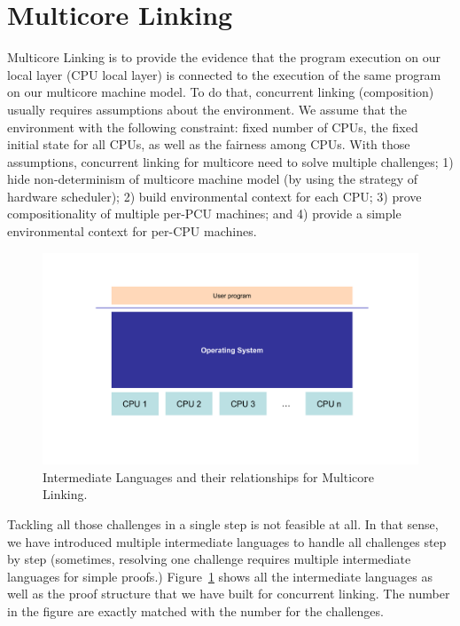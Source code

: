 \section{Multicore Linking}
\label{chapter:linking:sec:multicore-linking}

Multicore Linking is to provide the evidence that the program execution on
our local layer (CPU local layer) is connected to the execution of the same program on our multicore machine model. 
To do that, concurrent linking (composition) usually requires assumptions about the environment. 
We assume that the environment with the following constraint:
fixed number of CPUs, the fixed initial state for all CPUs,
as well as the fairness among CPUs.
With those assumptions, 
concurrent linking for multicore need to solve multiple challenges;
1) hide non-determinism of multicore machine model (by using the strategy of hardware scheduler);
2) build environmental context for each CPU;
3) prove compositionality of multiple per-PCU machines;
and 4) provide a simple environmental context for per-CPU machines. 
\begin{figure}
\begin{center}
\includegraphics[width=\textwidth, page=16]{figs/conlink/concurrent_linking}
\end{center}
\caption{Intermediate Languages and their relationships for Multicore Linking.}
\label{fig:chapter:conlink:intermediate-languages-and-their-relationsihps-for-multicore-linking}
\end{figure}
Tackling all those challenges in a single step is not feasible at all. 
In that sense, 
we have introduced multiple intermediate languages 
to handle all challenges step by step (sometimes,
resolving one challenge requires multiple intermediate languages
for simple proofs.) 
Figure~\ref{fig:chapter:conlink:intermediate-languages-and-their-relationsihps-for-multicore-linking} shows
all the intermediate languages as well as the proof structure that we have built for concurrent linking. 
The number in the figure are exactly matched with the number for the challenges. 








